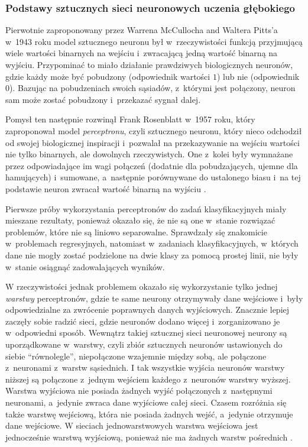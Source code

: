 {\subsubsection{Podstawy sztucznych sieci neuronowych uczenia głębokiego}

Pierwotnie zaproponowany przez Warrena McCullocha and Waltera Pitts'a w~1943 roku \cite{mcculloch1943logical} model sztucznego neuronu był w~rzeczywistości funkcją przyjmującą wiele wartości binarnych na wejściu i~zwracającą jedną wartość binarną na wyjściu.
Przypominać to miało działanie prawdziwych biologicznych neuronów, gdzie każdy może być pobudzony (odpowiednik wartości $1$) lub nie (odpowiednik $0$).
Bazując na pobudzeniach swoich sąsiadów, z~którymi jest połączony, neuron sam może zostać pobudzony i~przekazać sygnał dalej.

Pomysł ten następnie rozwinął Frank Rosenblatt w~1957 roku, który zaproponował model \emph{perceptronu}, czyli sztucznego neuronu, który nieco odchodził od swojej biologicznej inspiracji i~pozwalał na przekazywanie na wejściu wartości nie tylko binarnych, ale dowolnych rzeczywistych.
One z~kolei były wymnażane przez odpowiadające im wagi połączeń (dodatnie dla pobudzających, ujemne dla hamujących) i~sumowane, a~następnie porównywane do ustalonego biasu i~na tej podstawie neuron zwracał wartość binarną na wyjściu \cite{rosenbaltt1957perceptron}.

Pierwsze próby wykorzystania perceptronów do zadań klasyfikacyjnych miały mieszane rezultaty, ponieważ okazało się, że nie są one w~stanie rozwiązać problemów, które nie są liniowo separowalne.
Sprawdzały się znakomicie w~problemach regresyjnych, natomiast w~zadaniach klasyfikacyjnych, w~których dane nie mogły zostać podzielone na dwie klasy za pomocą prostej linii, nie były w~stanie osiągnąć zadowalających wyników.

W rzeczywistości jednak problemem okazało się wykorzystanie tylko jednej \emph{warstwy} perceptronów, gdzie te same neurony otrzymywały dane wejściowe i~były odpowiedzialne za zwrócenie poprawnych danych wyjściowych.
Znacznie lepiej zaczęły sobie radzić sieci, gdzie neuronów dodano więcej i~zorganizowano je w~odpowiedni sposób.
Wewnątrz takiej sztucznej sieci neuronowej neurony są uporządkowane w~warstwy, czyli zbiór sztucznych neuronów ustawionych do siebie ``równolegle'', niepołączone wzajemnie między sobą, ale połączone z~neuronami z~warstw sąsiednich.
I tak wszystkie wyjścia neuronów warstwy niższej są połączone z~jednym wejściem każdego z~neuronów warstwy wyższej.
Warstwa wyjściowa nie posiada żadnych wyjść połączonych z~następnymi neuronami, a~jedynie zwraca dane wyjściowe całej sieci.
Czasem rozróżnia się także warstwę wejściową, która nie posiada żadnych wejść, a~jedynie otrzymuje dane wejściowe.
W sieciach jednowarstwowych warstwa wejściowa jest jednocześnie warstwą wyjściową, ponieważ nie ma żadnych warstw pośrednich \cite{bishop1994neural}.

}
